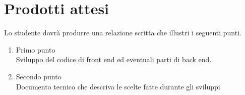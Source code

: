 \section*{Prodotti attesi}
Lo studente dovrà produrre una relazione scritta che illustri i seguenti punti.
\begin{enumerate}
    \item Primo punto \\
    Sviluppo del codice di front end ed eventuali parti di back end.
    
    \item Secondo punto \\
    Documento tecnico che descriva le scelte fatte durante gli sviluppi
\end{enumerate}
